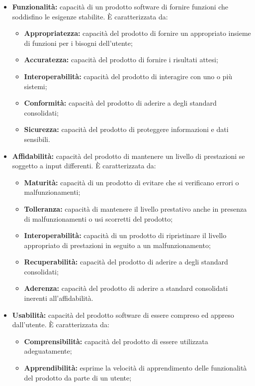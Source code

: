 \begin{itemize}
	\item \textbf{Funzionalità:} capacità di un prodotto software di fornire funzioni che soddisfino le esigenze stabilite. È caratterizzata da:
	\begin{itemize}
		\item \textbf{Appropriatezza:} capacità del prodotto di fornire un appropriato insieme di funzioni per i bisogni dell'utente;
		\item \textbf{Accuratezza:} capacità del prodotto di fornire i risultati attesi;
		\item \textbf{Interoperabilità:} capacità del prodotto di interagire con uno o più sistemi;
		\item \textbf{Conformità:} capacità del prodotto di aderire a degli standard consolidati;
		\item \textbf{Sicurezza:} capacità del prodotto di proteggere informazioni e dati sensibili.
	\end{itemize}
	\item \textbf{Affidabilità:} capacità del prodotto di mantenere un livello di prestazioni se soggetto a input differenti. È caratterizzata da:
	\begin{itemize}
		\item \textbf{Maturità:} capacità di un prodotto di evitare che si verificano errori o malfunzionamenti;
		\item \textbf{Tolleranza:} capacità di mantenere il livello prestativo anche in presenza di malfunzionamenti o usi scorretti del prodotto;
		\item \textbf{Interoperabilità:} capacità di un prodotto di ripristinare il livello appropriato di prestazioni in seguito a un malfunzionamento;
		\item \textbf{Recuperabilità:} capacità del prodotto di aderire a degli standard consolidati;
		\item \textbf{Aderenza:} capacità del prodotto di aderire a standard consolidati inerenti all'affidabilità.
	\end{itemize}
	\item \textbf{Usabilità:} capacità del prodotto software di essere compreso ed appreso dall'utente. È caratterizzata da:
	\begin{itemize}
		\item \textbf{Comprensibilità:} capacità del prodotto di essere utilizzata adeguatamente;
		\item \textbf{Apprendibilità:} esprime la velocità di apprendimento delle funzionalità del prodotto da parte di un utente;

\end{itemize}
\end{itemize}

